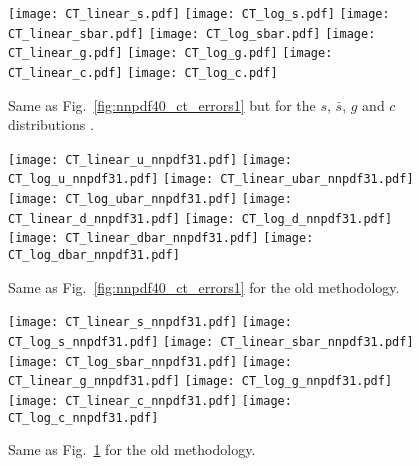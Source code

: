 \begin{figure}[ht]
    \centering
    \texttt{[image: CT\_linear\_s.pdf]}
    \texttt{[image: CT\_log\_s.pdf]}
    \texttt{[image: CT\_linear\_sbar.pdf]}
    \texttt{[image: CT\_log\_sbar.pdf]}
    \texttt{[image: CT\_linear\_g.pdf]}
    \texttt{[image: CT\_log\_g.pdf]}
    \texttt{[image: CT\_linear\_c.pdf]}
    \texttt{[image: CT\_log\_c.pdf]}
    \caption{Same as Fig.~\ref{fig:nnpdf40_ct_errors1} but for the $s$, $\bar{s}$, $g$ and $c$ distributions .}
    \label{fig:nnpdf40_ct_errors2}    
\end{figure}

\begin{figure}[ht]
    \centering
    \texttt{[image: CT\_linear\_u\_nnpdf31.pdf]}
    \texttt{[image: CT\_log\_u\_nnpdf31.pdf]}
    \texttt{[image: CT\_linear\_ubar\_nnpdf31.pdf]}
    \texttt{[image: CT\_log\_ubar\_nnpdf31.pdf]}
    \texttt{[image: CT\_linear\_d\_nnpdf31.pdf]}
    \texttt{[image: CT\_log\_d\_nnpdf31.pdf]}
    \texttt{[image: CT\_linear\_dbar\_nnpdf31.pdf]}
    \texttt{[image: CT\_log\_dbar\_nnpdf31.pdf]}
    \caption{Same as Fig.~\ref{fig:nnpdf40_ct_errors1} for the old methodology.}
    \label{fig:nnpdf31_ct_errors1}    
\end{figure}

\begin{figure}[ht]
    \centering
    \texttt{[image: CT\_linear\_s\_nnpdf31.pdf]}
    \texttt{[image: CT\_log\_s\_nnpdf31.pdf]}
    \texttt{[image: CT\_linear\_sbar\_nnpdf31.pdf]}
    \texttt{[image: CT\_log\_sbar\_nnpdf31.pdf]}
    \texttt{[image: CT\_linear\_g\_nnpdf31.pdf]}
    \texttt{[image: CT\_log\_g\_nnpdf31.pdf]}
    \texttt{[image: CT\_linear\_c\_nnpdf31.pdf]}
    \texttt{[image: CT\_log\_c\_nnpdf31.pdf]}
    \caption{Same as Fig.~\ref{fig:nnpdf40_ct_errors2} for the old methodology.}
    \label{fig:nnpdf31_ct_errors2}    
\end{figure}
\fi
